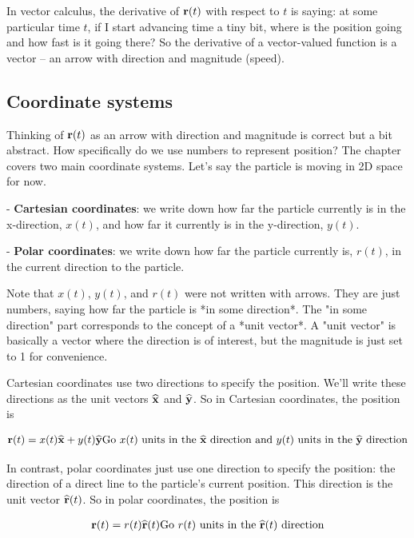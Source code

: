 In vector calculus, the derivative of $\mathbf{r}(t)$ with respect to $t$ is saying: at
some particular time $t$, if I start advancing time a tiny bit, where is the
position going and how fast is it going there? So the derivative of a
vector-valued function is a vector -- an arrow with direction and magnitude
(speed).


\subsection{Coordinate systems}

Thinking of $\mathbf{r}(t)$ as an arrow with direction and magnitude is correct but a
bit abstract. How specifically do we use numbers to represent position? The
chapter covers two main coordinate systems. Let's say the particle is moving in
2D space for now.

- \textbf{Cartesian coordinates}: we write down how far the particle currently is in
the x-direction, $x(t)$, and how far it currently is in the y-direction,
$y(t)$.

- \textbf{Polar coordinates}: we write down how far the particle currently is,
$r(t)$, in the current direction to the particle.

Note that $x(t)$, $y(t)$, and $r(t)$ were not written with arrows. They are
just numbers, saying how far the particle is *in some direction*. The "in some
direction" part corresponds to the concept of a *unit vector*. A "unit vector"
is basically a vector where the direction is of interest, but the magnitude is
just set to 1 for convenience.

Cartesian coordinates use two directions to specify the position. We'll write
these directions as the unit vectors $\mathbf{\widehat{x}}$ and $\mathbf{\widehat{y}}$. So in Cartesian
coordinates, the position is

\begin{align*}
  \mathbf{r}(t) = x(t)\mathbf{\widehat{x}} + y(t)\mathbf{\widehat{y}}
  \mathrm{Go~} x(t) \mathrm{~units~in~the~} \mathbf{\widehat{x}} \mathrm{~direction} \mathrm{~and~} y(t) \mathrm{~units~in~the~} \mathbf{\widehat{y}} \mathrm{~direction}
\end{align*}

In contrast, polar coordinates just use one direction to specify the position:
the direction of a direct line to the particle's current position. This
direction is the unit vector $\mathbf{\widehat{r}}(t)$. So in polar
coordinates, the position is


\begin{align*}
\mathbf{r}(t) = r(t)\mathbf{\widehat{r}}(t)
\mathrm{Go~} r(t) \mathrm{~units~in~the~} \mathbf{\widehat{r}}(t) \mathrm{~direction}
\end{align*}

